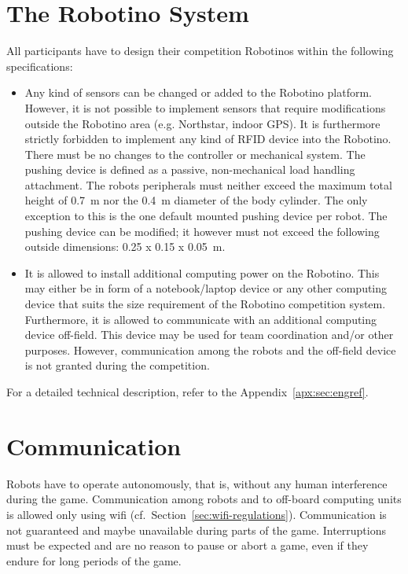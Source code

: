\documentclass[12pt,twoside]{article}
\newcommand{\Robotino}{Robotino}
\newcommand{\refsec}[1]{Section~\ref{#1}}
\begin{document}

\section{The Robotino System} \label{sec:robotino}

All participants have to design their competition Robotinos within
the following specifications:

\begin{itemize}
\item Any kind of sensors can be changed or added to the Robotino
  platform.  However, it is not possible to implement sensors that
  require modifications outside the Robotino area (e.g. Northstar,
  indoor GPS).  It is furthermore strictly forbidden to implement any
  kind of RFID device into the Robotino. There must be no changes to
  the controller or mechanical system. The pushing device is defined
  as a passive, non-mechanical load handling attachment. The robots
  peripherals must neither exceed the maximum total height of
  \SI{0.7}{\metre} nor the \SI{0.4}{\metre} diameter of the body
  cylinder. The only exception to this is the one default mounted
  pushing device per robot. The pushing device can be modified; it
  however must not exceed the following outside dimensions: \SI{0.25 x
    0.15 x 0.05}{\metre}.
\item It is allowed to install additional computing power on the
  \Robotino. This may either be in form of a notebook/laptop device or
  any other computing device that suits the size requirement of the
  \Robotino{} competition system. Furthermore, it is allowed to
  communicate with an additional computing device off-field. This
  device may be used for team coordination and/or other
  purposes. However, communication among the robots and the off-field
  device is not granted during the competition.
\end{itemize}

For a detailed technical description, refer to the
Appendix~\ref{apx:sec:engref}.

\section{Communication}
Robots have to operate autonomously, that is, without any human
interference during the game. Communication among robots and to
off-board computing units is allowed only using wifi
(cf.~\refsec{sec:wifi-regulations}). Communication is not guaranteed
and maybe unavailable during parts of the game. Interruptions must be
expected and are no reason to pause or abort a game, even if they
endure for long periods of the game.
\end{document}
